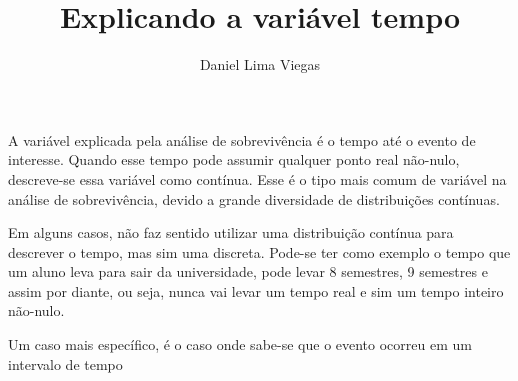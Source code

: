 \documentclass[12pt,a4paper]{article}
\author{Daniel Lima Viegas}
\title{Explicando a variável tempo}
\begin{document}
A variável explicada pela análise de sobrevivência é o tempo até o evento de interesse. Quando esse tempo pode assumir qualquer ponto real não-nulo, descreve-se essa variável como contínua. Esse é o tipo mais comum de variável na análise de sobrevivência, devido a grande diversidade de distribuições contínuas. %

Em alguns casos, não faz sentido utilizar uma distribuição contínua para descrever o tempo, mas sim uma discreta. Pode-se ter como exemplo o tempo que um aluno leva para sair da universidade, pode levar 8 semestres, 9 semestres e assim por diante, ou seja, nunca vai levar um tempo real e sim um tempo inteiro não-nulo.%

Um caso mais específico, é o caso onde sabe-se que o evento ocorreu em um intervalo de tempo %
\end{document}
